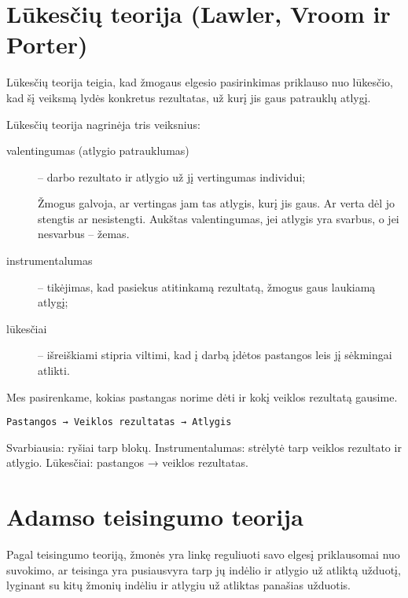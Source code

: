 \section{Lūkesčių teorija (Lawler, Vroom ir Porter)}

Lūkesčių teorija teigia, kad žmogaus elgesio pasirinkimas priklauso nuo
lūkesčio, kad šį veiksmą lydės konkretus rezultatas, už kurį jis
gaus patrauklų atlygį.

Lūkesčių teorija nagrinėja tris veiksnius:
\begin{description}
  \item[valentingumas (atlygio patrauklumas)] – darbo rezultato ir
    atlygio už jį vertingumas individui;
    \begin{note}
      Žmogus galvoja, ar vertingas jam tas atlygis, kurį jis gaus. Ar
      verta dėl jo stengtis ar nesistengti. Aukštas valentingumas,
      jei atlygis yra svarbus, o jei nesvarbus – žemas.
    \end{note}
  \item[instrumentalumas] – tikėjimas, kad pasiekus atitinkamą rezultatą,
    žmogus gaus laukiamą atlygį;
  \item[lūkesčiai] – išreiškiami stipria viltimi, kad į darbą įdėtos
    pastangos leis jį sėkmingai atlikti.
\end{description}

Mes pasirenkame, kokias pastangas norime dėti ir kokį veiklos rezultatą
gausime.

\begin{verbatim}
Pastangos → Veiklos rezultatas → Atlygis
\end{verbatim}

Svarbiausia: ryšiai tarp blokų. Instrumentalumas: strėlytė tarp veiklos
rezultato ir atlygio. Lūkesčiai: pastangos → veiklos rezultatas.

\section{Adamso teisingumo teorija}

Pagal teisingumo teoriją, žmonės yra linkę reguliuoti savo elgesį
priklausomai nuo suvokimo, ar teisinga yra pusiausvyra tarp jų indėlio
ir atlygio už atliktą užduotį, lyginant su kitų žmonių indėliu ir
atlygiu už atliktas panašias užduotis.

